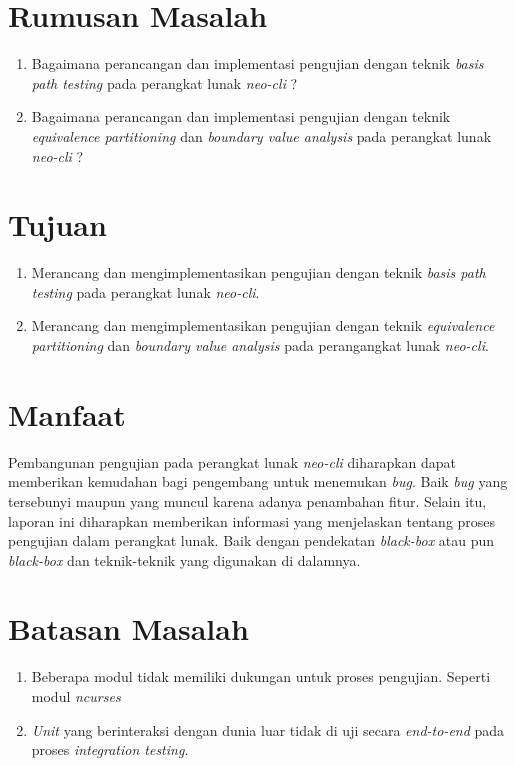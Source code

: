 \section{Rumusan Masalah}
\begin{enumerate}
\item Bagaimana perancangan dan implementasi pengujian dengan teknik
  \emph{basis path testing} pada perangkat lunak \emph{neo-cli} ?
\item Bagaimana perancangan dan implementasi pengujian dengan teknik
  \emph{equivalence partitioning} dan \emph{boundary value analysis}
  pada perangkat lunak \emph{neo-cli} ?
\end{enumerate}

\section{Tujuan}

\begin{enumerate}
\item Merancang dan mengimplementasikan pengujian dengan teknik
  \emph{basis path testing} pada perangkat lunak \emph{neo-cli}.
\item Merancang dan mengimplementasikan pengujian dengan teknik
  \emph{equivalence partitioning} dan \emph{boundary value analysis}
  pada perangangkat lunak \emph{neo-cli}.
\end{enumerate}


\section{Manfaat}

Pembangunan pengujian pada perangkat lunak \emph{neo-cli}
diharapkan dapat memberikan kemudahan bagi pengembang untuk menemukan
\emph{bug}. Baik \emph{bug} yang tersebunyi maupun yang muncul karena
adanya penambahan fitur. Selain itu, laporan ini diharapkan memberikan
informasi yang menjelaskan tentang proses pengujian
dalam perangkat lunak. Baik dengan pendekatan \emph{black-box} atau
pun \emph{black-box} dan teknik-teknik yang digunakan di dalamnya.

\section{Batasan Masalah}

\begin{enumerate}
\item Beberapa modul tidak memiliki dukungan untuk proses pengujian. Seperti
  modul \emph{ncurses}
\item \emph{Unit} yang berinteraksi dengan dunia luar tidak di uji
  secara \emph{end-to-end} pada proses \emph{integration testing}.
\end{enumerate}


